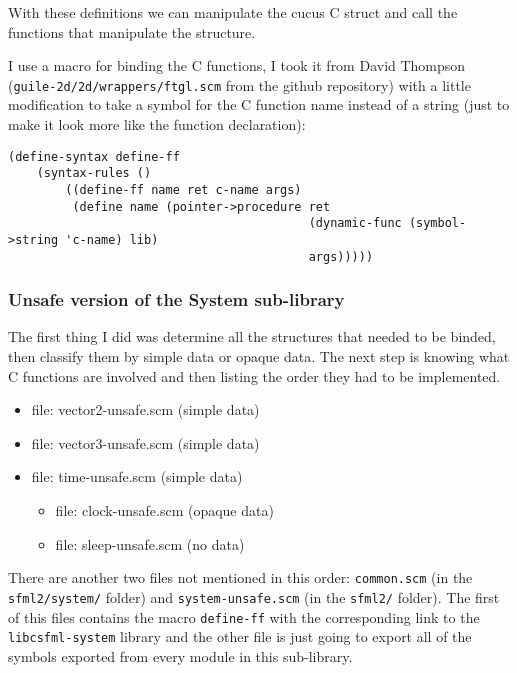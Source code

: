 \documentclass[latterpaper, leqno]{article}
\begin{document}
With these definitions we can manipulate the cucus C struct and call the functions that manipulate the structure.

I use a macro for binding the C functions, I took it from David Thompson (\texttt{guile-2d/2d/wrappers/ftgl.scm} from the github repository) with a little modification to take a symbol for the C function name instead of a string (just to make it look more like the function declaration):

\begin{verbatim}
(define-syntax define-ff
    (syntax-rules ()
        ((define-ff name ret c-name args)
         (define name (pointer->procedure ret
                                          (dynamic-func (symbol->string 'c-name) lib)
                                          args)))))
\end{verbatim}

\subsubsection*{Unsafe version of the System sub-library}
The first thing I did was determine all the structures that needed to be binded, then classify them by simple data or opaque data. The next step is knowing what C functions are involved and then listing the order they had to be implemented.

\begin{itemize}
  \item file: vector2-unsafe.scm (simple data)
  \item file: vector3-unsafe.scm (simple data)
  \item file: time-unsafe.scm (simple data)
    \begin{itemize}
      \item file: clock-unsafe.scm (opaque data)
      \item file: sleep-unsafe.scm (no data)
    \end{itemize}
\end{itemize}

There are another two files not mentioned in this order: \texttt{common.scm} (in the \texttt{sfml2/system/} folder) and \texttt{system-unsafe.scm} (in the \texttt{sfml2/} folder). The first of this files contains the macro \texttt{define-ff} with the corresponding link to the \texttt{libcsfml-system} library and the other file is just going to export all of the symbols exported from every module in this sub-library.

\bigskip
\end{document}
